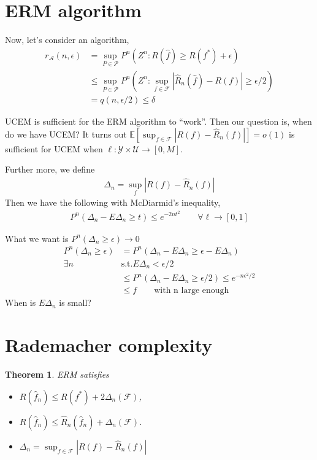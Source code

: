 \documentclass[10pt]{article}
\newcounter{lecnum}
\newtheorem{theorem}{Theorem}[lecnum]
\newcommand{\F}{\mathcal{F}}
\newcommand{\Expect}[1]{\mathbb{E}\!\left[#1\right]}
\newcommand{\Y}{\mathcal{Y}}
\newcommand{\U}{\mathcal{U}}
\renewcommand{\hat}{\widehat}
\begin{document}
\section{ERM algorithm}

Now, let's consider an algorithm,
\begin{align*}
r_{\mathcal{A}}(n,\epsilon) &= \sup_{P \in \mathcal{P}} P^n (Z^n: R(\hat f) \ge R(f^*) + \epsilon)\\
&\le \sup_{P \in \mathcal{P}} P^n(Z^n : \sup_{f\in\mathcal{F}} | \hat R_n(\hat f) - R(f) | \ge \epsilon / 2)\\
&= q(n, \epsilon / 2) \le \delta
\end{align*}

UCEM is sufficient for the ERM algorithm to ``work''. Then our question is, when do we have UCEM? It turns out $\Expect{\sup_{f\in\mathcal{F}} | R(f) - \hat R_n(f) |} = o(1)$ is sufficient for UCEM when $\ell : \Y \times \U \rightarrow [0, M]$.

Further more, we define
\begin{align*}
\Delta_n = \sup_f | R(f) - \hat R_n(f) |
\end{align*}
Then we have the following with McDiarmid's inequality,
\begin{align*}
P^n(\Delta_n - E \Delta_n \ge t) \le e^{-2nt^2} \qquad \forall \ell \rightarrow [0,1]
\end{align*}

What we want is $P^n(\Delta_n \ge \epsilon) \rightarrow 0$
\begin{align*}
P^n(\Delta_n \ge \epsilon) &= P^n(\Delta_n - E \Delta_n \ge \epsilon - E \Delta_n)\\
\exists n &\text{s.t.} E \Delta_n < \epsilon/2\\
	&\le P^n(\Delta_n - E \Delta_n \ge \epsilon / 2) \le e^{-n\epsilon^2/2}\\
	&\le f \qquad \text{with n large enough}
\end{align*}
When is $E\Delta_n$ is small?

\section{Rademacher complexity}
\begin{theorem}
ERM satisfies
\begin{itemize}
\item $R(\hat f_n) \le R(f^*) + 2 \Delta_n(\F)$,
\item $R(\hat f_n) \le \hat R_n(\hat f_n) + \Delta_n(\F)$.
\item $\Delta_n = \sup_{f\in\mathcal{F}} | R(f) - \hat R_n(f) |$
\end{itemize}
\end{theorem}
\end{document}
